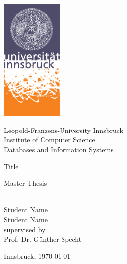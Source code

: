 %




\parindent 0cm 


\begin{titlepage}

\begin{center}
\includegraphics[width=30mm]{unilog4c} \\[3mm]

\begin{large}
Leopold-Franzens-University Innsbruck\\[5mm]
Institute of Computer Science\\
Databases and Information Systems\\[25mm]
\end{large}

\begin{LARGE}Title\\ \end{LARGE}
\begin{footnotesize}Master Thesis\end{footnotesize}\\[15mm]


Student Name \\ Student Name\\[35mm]

supervised by\\
Prof. Dr. G\"{u}nther Specht\\[10mm]

\begin{footnotesize}Innsbruck, \today \end{footnotesize}
\end{center}
\end{titlepage}





